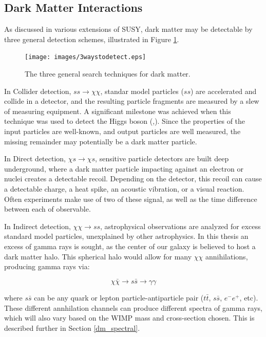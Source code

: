   \subsection{Dark Matter Interactions}
    As discussed in various extensions of SUSY, dark matter may be detectable by three general detection schemes, illustrated in Figure \ref{fig:3_searches}.

    \begin{figure}[ht]
      \centering
      \texttt{[image: images/3waystodetect.eps]}
      \caption[3 Search Techniques]{
        The three general search techniques for dark matter.}
      \label{fig:3_searches}
    \end{figure}

    In Collider detection, $ss \rightarrow \chi\chi$, standar model particles ($ss$) are accelerated and collide in a detector, and the resulting particle fragments are measured by a slew of measuring equipment.
    A significant milestone was achieved when this technique was used to detect the Higgs boson (\cite{Higgs_ATLAS},\cite{Higgs_CMS}).
    Since the properties of the input particles are well-known, and output particles are well measured, the missing remainder may potentially be a dark matter particle.

    In Direct detection, $\chi s \rightarrow \chi s$, sensitive particle detectors are built deep underground, where a dark matter particle impacting against an electron or nuclei creates a detectable recoil.
    Depending on the detector, this recoil can cause a detectable charge, a heat spike, an acoustic vibration, or a visual reaction.
    Often experiments make use of two of these signal, as well as the time difference between each of observable.

    In Indirect detection, $\chi\chi \rightarrow ss$, astrophysical observations are analyzed for excess standard model particles, unexplained by other astrophysics.
    In this thesis an excess of gamma rays is sought, as the center of our galaxy is believed to host a dark matter halo.
    This spherical halo would allow for many $\chi\chi$ annihilations, producing gamma rays via: 

    $$\chi\bar{\chi} \rightarrow s\bar{s} \rightarrow \gamma\gamma$$

    where $s\bar{s}$ can be any quark or lepton particle-antiparticle pair ($t\bar{t}$, $s\bar{s}$, $e^{-}e^{+}$, etc).
    These different annhilation channels can produce different spectra of gamma rays, which will also vary based on the WIMP mass and cross-section chosen.
    This is described further in Section \ref{dm_spectral}.


